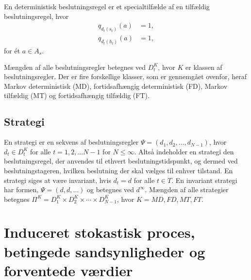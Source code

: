 \pagebreak

En deterministisk beslutningsregel er et specialtilfælde af en tilfældig beslutningsregel, hvor 
\begin{align*}
    q_{d_t(s_t)}(a)&=1, \\
    q_{d_t(h_t)}(a)&=1, 
\end{align*}
for ét $a\in A_s$. 

Mængden af alle beslutningsregler betegnes ved $D_t^K$, hvor $K$ er klassen af beslutningsregler. Der er fire forskellige klasser, som er gennemgået ovenfor, heraf Markov deterministisk (MD), fortidsafhængig deterministisk (FD), Markov tilfældig (MT) og fortidsafhængig tilfældig (FT). 

\subsection{Strategi}
En strategi er en sekvens af beslutningsregler $\Psi=(d_1,d_2,\dots,d_{N-1})$, hvor $d_t\in D_t^K$ for alle $t=1, 2, \dots N-1$ for $N \leq \infty$. Altså indeholder en strategi den beslutningsregel, der anvendes til ethvert beslutningstidspunkt, og dermed ved beslutningstageren, hvilken beslutning der skal vælges til enhver tilstand. En strategi siges at være invariant, hvis $d_t=d$ for alle $t\in T$. En invariant strategi har formen, $\Psi=(d,d,\dots)$ og betegnes ved $d^\infty$. 
Mængden af alle strategier betegnes $\Pi^K=D_1^K\times D_2^K\times \cdots\times D_{N-1}^K$, hvor $K=MD, FD, MT, FT$.



\section{Induceret stokastisk proces, betingede sandsynligheder og forventede værdier}



